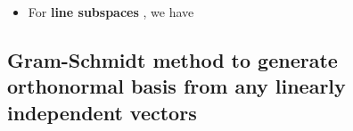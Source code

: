 \begin{itemize}
\begin{itemize}
                \begin{itemize}

                  \item
                        For \textbf{line subspaces} , we
                        have
                \end{itemize}
        \end{itemize}
\end{itemize}

\subsection*{Gram-Schmidt method to generate orthonormal basis from any
  linearly independent
  vectors}

